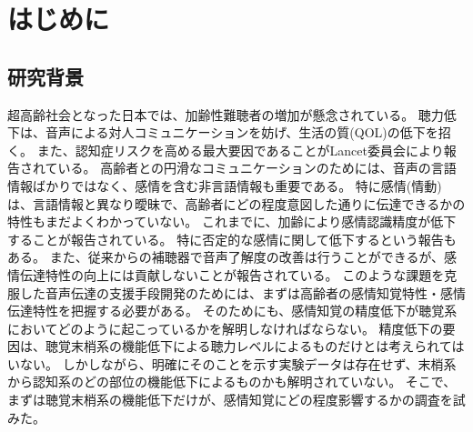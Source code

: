 
\chapter{はじめに}
\label{chap:Intro}


\section{研究背景}
\label{sec:研究背景}
超高齢社会となった日本では、加齢性難聴者の増加が懸念されている。
聴力低下は、音声による対人コミュニケーションを妨げ、生活の質(QOL)の低下を招く。
また、認知症リスクを高める最大要因であることがLancet委員会により報告されている\cite{livingston2024dementia-Short}。
高齢者との円滑なコミュニケーションのためには、音声の言語情報ばかりではなく、感情を含む非言語情報も重要である。
特に感情(情動)は、言語情報と異なり曖昧で、高齢者にどの程度意図した通りに伝達できるかの特性もまだよくわかっていない。
これまでに、加齢により感情認識精度が低下することが報告されている\cite{paulmann2008aging,ben2019age,amorim2021changes}。
特に否定的な感情に関して低下するという報告もある\cite{mill2009age}。
また、従来からの補聴器で音声了解度の改善は行うことができるが、感情伝達特性の向上には貢献しないことが報告されている\cite{goy2018hearing}。
このような課題を克服した音声伝達の支援手段開発のためには、まずは高齢者の感情知覚特性・感情伝達特性を把握する必要がある。
そのためにも、感情知覚の精度低下が聴覚系においてどのように起こっているかを解明しなければならない。
精度低下の要因は、聴覚末梢系の機能低下による聴力レベルによるものだけとは考えられてはいない。
しかしながら、明確にそのことを示す実験データは存在せず、末梢系から認知系のどの部位の機能低下によるものかも解明されていない。
そこで、まずは聴覚末梢系の機能低下だけが、感情知覚にどの程度影響するかの調査を試みた。

